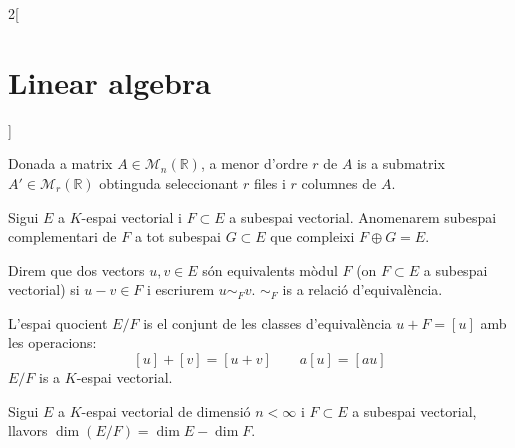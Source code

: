 \documentclass[../../../main.tex]{subfiles}
\begin{document}
\begin{multicols}{2}[\section{Linear algebra}]
\begin{definition}
Donada a matrix $A\in\mathcal{M}_n(\mathbb{R})$, a menor d'ordre $r$ de $A$ is a submatrix $A'\in\mathcal{M}_r(\mathbb{R})$ obtinguda seleccionant $r$ files i $r$ columnes de $A$.
\end{definition}
\begin{definition}
Sigui $E$ a $K$-espai vectorial i $F\subset E$ a subespai vectorial. Anomenarem subespai complementari de $F$ a tot subespai $G\subset E$ que compleixi $F\oplus G=E$.
\end{definition}
\begin{definition}
Direm que dos vectors $u,v\in E$ són equivalents mòdul $F$ (on $F\subset E$ a subespai vectorial) si $u-v\in F$ i escriurem $u\sim_Fv$. $\sim_F$ is a relació d'equivalència.
\end{definition}
\begin{definition}
L'espai quocient $E/F$ is el conjunt de les classes d'equivalència $u+F=[u]$ amb les operacions:
$$[u]+[v]=[u+v]\qquad a[u]=[au]$$ $E/F$ is a $K$-espai vectorial.
\end{definition}
\begin{prop}
Sigui $E$ a $K$-espai vectorial de dimensió $n<\infty$ i $F\subset E$ a subespai vectorial, llavors $\dim (E/F)=\dim E-\dim F$.
\end{prop}

\end{multicols}
\end{document}
